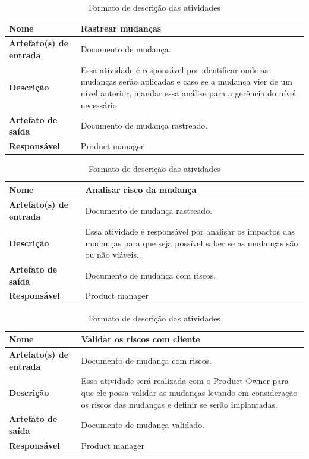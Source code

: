 \begin{table}[h]
    \centering
    \label{descricaoAtividades}
    \caption{Formato de descrição das atividades}
        \begin{tabular}{|l|p{10cm}|}
        \hline
        \textbf{Nome} & Rastrear mudanças \\
        \hline
        \textbf{Artefato(s) de entrada} & Documento de mudança. \\
        \hline
        \textbf{Descrição} & Essa atividade é responsável por identificar onde as mudanças serão aplicadas e caso se a mudança vier de um nível anterior, mandar essa análise para a gerência do nível necessário. \\
        \hline
        \textbf{Artefato de saída} & Documento de mudança rastreado. \\
        \hline
        \textbf{Responsável} & Product manager \\
        \hline
    \end{tabular}
\end{table}

\begin{table}[h]
    \centering
    \label{descricaoAtividades}
    \caption{Formato de descrição das atividades}
        \begin{tabular}{|l|p{10cm}|}
        \hline
        \textbf{Nome} & Analisar risco da mudança \\
        \hline
        \textbf{Artefato(s) de entrada} & Documento de mudança rastreado. \\
        \hline
        \textbf{Descrição} & Essa atividade é responsável por analisar os impactos das mudanças para que seja possível saber se as mudanças são ou não viáveis. \\
        \hline
        \textbf{Artefato de saída} & Documento de mudança com riscos. \\
        \hline
        \textbf{Responsável} & Product manager \\
        \hline
    \end{tabular}
\end{table}

\begin{table}[h]
    \centering
    \label{descricaoAtividades}
    \caption{Formato de descrição das atividades}
        \begin{tabular}{|l|p{10cm}|}
        \hline
        \textbf{Nome} & Validar os riscos com cliente \\
        \hline
        \textbf{Artefato(s) de entrada} & Documento de mudança com riscos. \\
        \hline
        \textbf{Descrição} & Essa atividade será realizada com o Product Owner para que ele possa validar as mudanças levando em consideração os riscos das mudanças e definir se serão implantadas. \\
        \hline
        \textbf{Artefato de saída} & Documento de mudança validado. \\
        \hline
        \textbf{Responsável} & Product manager \\
        \hline
    \end{tabular}
\end{table}

